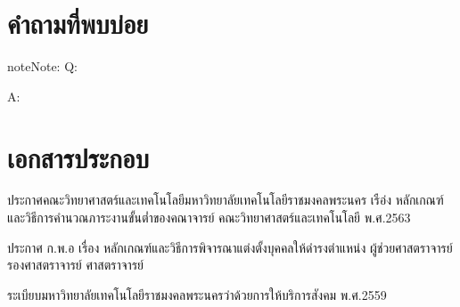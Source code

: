 \documentclass[a4paper,12pt,english]{sphinxmanual}
\begin{document}
\chapter{คำถามที่พบบ่อย}
\label{\detokenize{faq:id1}}\label{\detokenize{faq::doc}}
\begin{sphinxadmonition}{note}{Note:}
Q:

A:
\end{sphinxadmonition}


\chapter{เอกสารประกอบ}
\label{\detokenize{official_documents:id1}}\label{\detokenize{official_documents::doc}}
ประกาศคณะวิทยาศาสตร์และเทคโนโลยีมหาวิทยาลัยเทคโนโลยีราชมงคลพระนคร เรือ่ง หลักเกณฑ์ และวิธีการคำนวณภาระงานขั้นต่ำของคณาจารย์ คณะวิทยาศาสตร์และเทคโนโลยี พ.ศ.2563

ประกาศ ก.พ.อ เรื่อง หลักเกณฑ์และวิธีการพิจารณาแต่งตั้งบุคคลให้ดำรงตำแหน่ง ผู้ช่วยศาสตราจารย์ รองศาสตราจารย์ ศาสตราจารย์

ระเบียบมหาวิทยาลัยเทคโนโลยีราชมงคลพระนครว่าด้วยการให้บริการสังคม พ.ศ.2559



\renewcommand{\indexname}{Index}
\printindex
\end{document}
